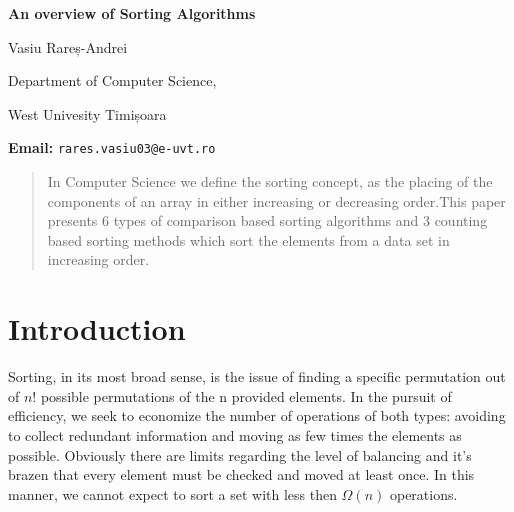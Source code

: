 \documentclass[11pt, letter paper]{article}
\begin{document}
    

    
    \begin{titlepage}
        \begin{center}
            \Large\textbf{An overview of Sorting Algorithms}

            \vspace{1cm}
            \large Vasiu Rareș-Andrei
            
            \vspace{0.1cm}
            Department of Computer Science,
            
            \vspace{0.1cm}
            West Univesity Timișoara
            
            \vspace{0.1cm}
            \textbf{Email:}
            \texttt{rares.vasiu03@e-uvt.ro}
            
            \vspace{1cm}
        \end{center}

        \begin{abstract}
            In Computer Science we define the sorting concept, as the placing of the components of an array in either increasing or decreasing order.This paper presents 6 types of comparison based sorting algorithms and 3 counting based sorting methods which sort the elements from a data set in increasing order.
        \end{abstract}
    \end{titlepage}
    
    \tableofcontents 

    \newpage

\section{Introduction}
\label{sec:intro}
    Sorting, in its most broad sense, is the issue of finding a specific permutation out of $n!$ possible permutations of the n provided elements.
    In the pursuit of efficiency, we seek to economize the number of operations of both types: avoiding to collect redundant information and moving as few times the elements as possible.
    Obviously there are limits regarding the level of balancing and it’s brazen that every element must be checked and moved at least once. In this manner, we cannot expect to sort a set with less then $\Omega(n)$ operations.
\end{document}
